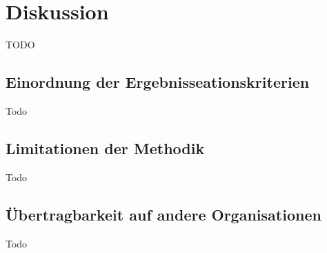 \section{Diskussion}
TODO

\subsection{Einordnung der Ergebnisseationskriterien}
Todo

\subsection{Limitationen der Methodik}
Todo

\subsection{Übertragbarkeit auf andere Organisationen}
Todo
